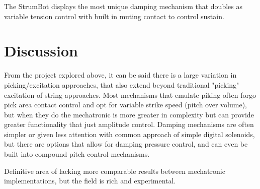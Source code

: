 \documentclass[11pt]{article}
\begin{document}
The StrumBot\cite{strumbot} displays the most unique damping mechanism that doubles as variable tension control with built in muting contact to control sustain. 


\section{Discussion}
From the project explored above, it can be said there is a large variation in picking/excitation approaches, that also extend beyond traditional "picking" excitation of string approaches. Most mechanisms that emulate piking often forgo pick area contact control and opt for variable strike speed (pitch over volume), but when they do the mechatronic is more greater in complexity but can provide greater functionality that just amplitude control\cite{strumbot}. Damping mechanisms are often simpler or given less attention with common  approach of simple digital solenoids, but there are options that allow for damping pressure control, and can even be built into compound pitch control mechanisms.

Definitive area of lacking more comparable results between mechatronic implementations, but the field is rich and experimental.


\newpage


\end{document}
